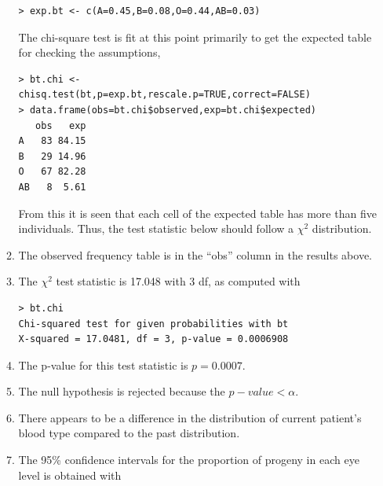 \documentclass[10pt,openany]{book}\usepackage[]{graphicx}\usepackage[]{color}
\makeatletter
\newenvironment{kframe}{%
 \def\at@end@of@kframe{}%
 \ifinner\ifhmode%
  \def\at@end@of@kframe{\end{minipage}}%
  \begin{minipage}{\columnwidth}%
 \fi\fi%
 \def\FrameCommand##1{\hskip\@totalleftmargin \hskip-\fboxsep
 \colorbox{shadecolor}{##1}\hskip-\fboxsep
     \hskip-\linewidth \hskip-\@totalleftmargin \hskip\columnwidth}%
 \MakeFramed {\advance\hsize-\width
   \@totalleftmargin\z@ \linewidth\hsize
   \@setminipage}}%
 {\par\unskip\endMakeFramed%
 \at@end@of@kframe}
\newenvironment{knitrout}{}{} %
\makeatother
\begin{document}
\begin{itemize}
\begin{enumerate}
\begin{knitrout}
\begin{kframe}
\begin{verbatim}
> exp.bt <- c(A=0.45,B=0.08,O=0.44,AB=0.03)
\end{verbatim}
\end{kframe}
\end{knitrout}
The chi-square test is fit at this point primarily to get the expected table for checking the assumptions,
\begin{knitrout}
\color{fgcolor}\begin{kframe}
\begin{verbatim}
> bt.chi <- chisq.test(bt,p=exp.bt,rescale.p=TRUE,correct=FALSE)
> data.frame(obs=bt.chi$observed,exp=bt.chi$expected)
   obs   exp
A   83 84.15
B   29 14.96
O   67 82.28
AB   8  5.61
\end{verbatim}
\end{kframe}
\end{knitrout}
From this it is seen that each cell of the expected table has more than five individuals.  Thus, the test statistic below should follow a $\chi^{2}$ distribution.
      \item The observed frequency table is in the ``obs'' column in the results above.
      \item The $\chi^{2}$ test statistic is 17.048 with 3 df, as computed with
\begin{knitrout}
\color{fgcolor}\begin{kframe}
\begin{verbatim}
> bt.chi
Chi-squared test for given probabilities with bt 
X-squared = 17.0481, df = 3, p-value = 0.0006908
\end{verbatim}
\end{kframe}
\end{knitrout}
      \item The p-value for this test statistic is $p=0.0007$.
      \item The null hypothesis is rejected because the $p-value<\alpha$.
      \item There appears to be a difference in the distribution of current patient's blood type compared to the past distribution.
      \item The 95\% confidence intervals for the proportion of progeny in each eye level is obtained with
\begin{knitrout}
\color{fgcolor}\begin{kframe}
\begin{verbatim}

\end{verbatim}
\end{kframe}
\end{knitrout}
\end{enumerate}
\end{itemize}
\end{document}

